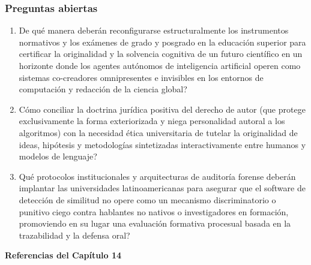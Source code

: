 \subsubsection*{Preguntas abiertas}
\begin{enumerate}[leftmargin=1.8em, itemsep=0.35em]
    \item \textquestiondown De qué manera deberán reconfigurarse estructuralmente los instrumentos normativos y los exámenes de grado y posgrado en la educación superior para certificar la originalidad y la solvencia cognitiva de un futuro científico en un horizonte donde los agentes autónomos de inteligencia artificial operen como sistemas co-creadores omnipresentes e invisibles en los entornos de computación y redacción de la ciencia global?
    \item \textquestiondown Cómo conciliar la doctrina jurídica positiva del derecho de autor (que protege exclusivamente la forma exteriorizada y niega personalidad autoral a los algoritmos) con la necesidad ética universitaria de tutelar la originalidad de ideas, hipótesis y metodologías sintetizadas interactivamente entre humanos y modelos de lenguaje?
    \item \textquestiondown Qué protocolos institucionales y arquitecturas de auditoría forense deberán implantar las universidades latinoamericanas para asegurar que el software de detección de similitud no opere como un mecanismo discriminatorio o punitivo ciego contra hablantes no nativos o investigadores en formación, promoviendo en su lugar una evaluación formativa procesual basada en la trazabilidad y la defensa oral?
\end{enumerate}

\newpage
{}
\vspace*{0.8cm}
{\Huge \textbf{Referencias del Capítulo 14}}\\[0.8cm]

